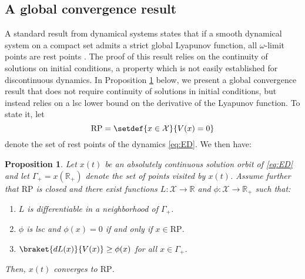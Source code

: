 \documentclass[reqno]{amsart}
\theoremstyle{plain}
\newtheorem{proposition}[theorem]{Proposition}
\theoremstyle{definition}
\theoremstyle{remark}
\numberwithin{equation}{section}
\numberwithin{theorem}{section}
\begin{document}
\subsection{A global convergence result}

A standard result from dynamical systems states that if a smooth dynamical system on a compact set admits a strict global Lyapunov function, all $\omega$-limit points are rest points \citep[see e.g.][Theorem 7.B.3]{San10}.  
The proof of this result relies on the continuity of solutions on initial conditions, a property which is not easily established for discontinuous dynamics.
In Proposition \ref{prop:omega} below, we present a global convergence result that does not require continuity of solutions in initial conditions, but instead relies on a \ac{lsc} lower bound on the derivative of the Lyapunov function.
To state it, let
\begin{equation}
{\mathrm{RP}}	
	= \setdef{x\in{\mathcal{X}}}{{V}(x) = 0}
\end{equation}
denote the set of rest points of the dynamics \eqref{eq:ED}.
We then have:

\begin{proposition}
\label{prop:omega}
Let $x(t)$ be an absolutely continuous solution orbit of \eqref{eq:ED} and let $\Gamma_{+} = x({\mathbb{R}}_{+})$ denote the set of points visited by $x(t)$.
Assume further that ${\mathrm{RP}}$ is closed and there exist functions ${L}{\colon}{\mathcal{X}}\to{\mathbb{R}}$ and ${\phi}{\colon}{\mathcal{X}}\to{\mathbb{R}}_{+}$ such that:
\begin{enumerate}
\item
\label{itm:omega-smooth}
${L}$ is differentiable in a neighborhood of $\Gamma_{+}$.
\item
\label{itm:omega-rest}
${\phi}$ is \acl{lsc} and ${\phi}(x) = 0$ if and only if $x \in {\mathrm{RP}}$.
\item
\label{itm:omega-Lyap}
$\braket{d{L}(x)}{{V}(x)} \geq {\phi}(x)$ for all $x\in \Gamma_{+}$.

\end{enumerate}
Then, $x(t)$ converges to ${\mathrm{RP}}$.
\end{proposition}
\end{document}
